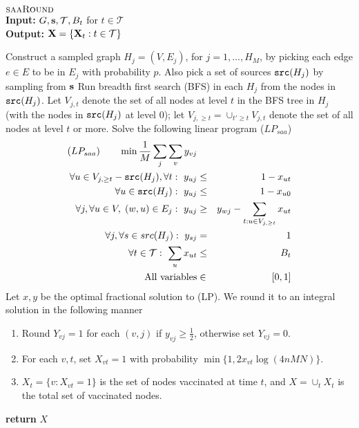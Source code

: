 \begin{algorithm}{}
\small
\caption{\small $\textsc{saaRound}{}$\\
\textbf{Input:} $G, \mathbf{s}, \mathcal{T}, B_t$ for $t\in\mathcal{T}$\\
\textbf{Output:} $\mathbf{X}=\{\mathbf{X}_t: t\in\mathcal{T}\}$
}
\label{alg:saaround}
\begin{algorithmic}[1]
\STATE
Construct a sampled graph $H_j=(V, E_j)$, for $j=1,\ldots,H_M$, by picking each edge $e\in E$ to be in $E_j$
with probability $p$. Also pick a set of sources $\texttt{src}(H_j)$ by sampling from $\mathbf{s}$
\STATE
Run breadth first search (BFS) in each $H_j$ from the nodes in $\texttt{src}(H_j)$.
Let $V_{j,t}$ denote the set of all nodes at level $t$ in the BFS tree in $H_j$ 
(with the nodes in $\texttt{src}(H_j)$ at level $0$); let $V_{j,\geq t}=\cup_{t'\geq t} V_{j,t}$ denote
the set of all nodes at level $t$ or more.
\STATE
Solve the following linear program ($LP_{saa}$)
\begin{eqnarray}
\label{eqn:obj}
(LP_{saa}) \qquad  \min \frac{1}{M}\sum_j \sum_v y_{vj} && \\
\label{eqn:xy}
\forall u \in V_{j, \geq t} - \texttt{src}(H_j), \forall t:\ y_{uj} &\leq& 1 - x_{ut} \\
\label{eqn:xy2}
\forall u \in \texttt{src}(H_j):\ y_{uj} &\leq& 1 - x_{u0} \\
\label{eqn1}
\forall j, \forall u\in V, \; (w, u)\in E_j:\ y_{uj} &\geq& y_{wj} - \sum_{t: u \in V_{j, \geq t}} x_{ut}\\
\label{eqn:src}
\forall j, \forall s \in src(H_j):\ y_{sj} &=& 1\\
\label{eqn:budget}
\forall t\in\mathcal{T}:\ \sum_u x_{ut} &\leq& B_t\\
\label{eqn01}
\mbox{All variables} &\in& [0, 1]
\end{eqnarray}
\STATE
Let $x, y$ be the optimal fractional solution to (LP).
We round it to an integral solution in the following manner
\begin{enumerate}
\item
Round $Y_{vj} = 1$ for each $(v,j)$ if $y_{vj} \geq \frac{1}{2}$, otherwise set $Y_{vj} = 0$.
\item
For each $v, t$, set $X_{vt}=1$ with probability $\min\{1, 2 x_{vt}\log(4nMN)\}$. 
\item
$X_t=\{v: X_{vt}=1\}$ is the set of nodes vaccinated at time $t$, and $X=\cup_t X_t$
is the total set of vaccinated nodes.
\end{enumerate}
\STATE \textbf{return} $X$
\end{algorithmic}
\end{algorithm}

